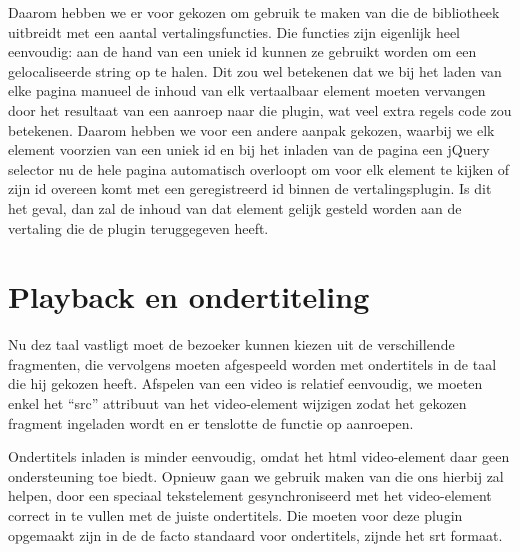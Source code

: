 Daarom hebben we er voor gekozen om gebruik te maken van  die de bibliotheek uitbreidt met een aantal vertalingsfuncties. Die functies zijn eigenlijk heel eenvoudig: aan de hand van een uniek id kunnen ze gebruikt worden om een gelocaliseerde string op te halen. Dit zou wel betekenen dat we bij het laden van elke pagina manueel de inhoud van elk vertaalbaar element moeten vervangen door het resultaat van een aanroep naar die plugin, wat veel extra regels code zou betekenen. Daarom hebben we voor een andere aanpak gekozen, waarbij we elk element voorzien van een uniek id en bij het inladen van de pagina een jQuery selector nu de hele pagina automatisch overloopt om voor elk element te kijken of zijn id overeen komt met een geregistreerd id binnen de vertalingsplugin. Is dit het geval, dan zal de inhoud van dat element gelijk gesteld worden aan de vertaling die de plugin teruggegeven heeft.

\section{Playback en ondertiteling}

Nu dez taal vastligt moet de bezoeker kunnen kiezen uit de verschillende fragmenten, die vervolgens moeten afgespeeld worden met ondertitels in de taal die hij gekozen heeft. Afspelen van een video is relatief eenvoudig, we moeten enkel het ``src'' attribuut van het video-element wijzigen zodat het gekozen fragment ingeladen wordt en er tenslotte de  functie op aanroepen.

Ondertitels inladen is minder eenvoudig, omdat het \ac{html} video-element daar geen ondersteuning toe biedt. Opnieuw gaan we gebruik maken van  die ons hierbij zal helpen, door een speciaal tekstelement gesynchroniseerd met het video-element correct in te vullen met de juiste ondertitels. Die moeten voor deze plugin opgemaakt zijn in de de facto standaard voor ondertitels, zijnde het \ac{srt} formaat.
